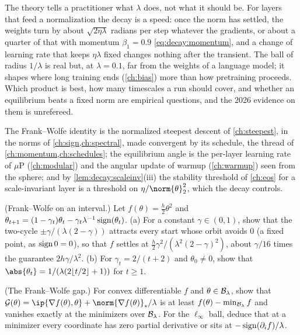 \begin{refsection}
The theory tells a practitioner what $\lambda$ does, not what it should be. For layers that feed a normalization the decay is a speed: once the norm has settled, the weights turn by about $\sqrt{2\eta\lambda}$ radians per step whatever the gradients, or about a quarter of that with momentum $\beta_1=0.9$ \eqref{eq:decay:momentum}, and a change of learning rate that keeps $\eta\lambda$ fixed changes nothing after the transient. The ball of radius $1/\lambda$ is real but, at $\lambda=0.1$, far from the weights of a language model; it shapes where long training ends (\cref{ch:bias}) more than how pretraining proceeds. Which product is best, how many timescales a run should cover, and whether an equilibrium beats a fixed norm are empirical questions, and the 2026 evidence on them is unrefereed.

The Frank--Wolfe identity is the normalized steepest descent of \cref{ch:steepest}, in the norms of \cref{ch:sign,ch:spectral}, made convergent by its schedule, the thread of \cref{ch:momentum,ch:schedules}; the equilibrium angle is the per-layer learning rate of $\mu$P (\cref{ch:modular}) and the angular update of warmup (\cref{ch:warmup}) seen from the sphere; and by \cref{lem:decay:scaleinv}(iii) the stability threshold of \cref{ch:eos} for a scale-invariant layer is a threshold on $\eta/\norm{\theta}_2^2$, which the decay controls.

\begin{exercises}
\item \consolidation (Frank--Wolfe on an interval.) Let $f(\theta)=\frac h2\theta^2$ and $\theta_{t+1}=(1-\gamma_t)\theta_t-\gamma_t\lambda^{-1}\operatorname{sign}(\theta_t)$. (a) For a constant $\gamma\in(0,1)$, show that the two-cycle $\pm\gamma/(\lambda(2-\gamma))$ attracts every start whose orbit avoids $0$ (a fixed point, as $\operatorname{sign}0=0$), so that $f$ settles at $\frac h2\gamma^2/(\lambda^2(2-\gamma)^2)$, about $\gamma/16$ times the guarantee $2h\gamma/\lambda^2$. (b) For $\gamma_t=2/(t+2)$ and $\theta_0\ne0$, show that $\abs{\theta_t}=1/(\lambda(2\lfloor t/2\rfloor+1))$ for $t\ge1$.\label{ex:decay:cycle}

\item \consolidation (The Frank--Wolfe gap.) For convex differentiable $f$ and $\theta\in\mathcal{B}_\lambda$, show that $\mathcal G(\theta)=\ip{\nabla f(\theta),\theta}+\norm{\nabla f(\theta)}_*/\lambda$ is at least $f(\theta)-\min_{\mathcal{B}_\lambda}f$ and vanishes exactly at the minimizers over $\mathcal{B}_\lambda$. For the $\ell_\infty$ ball, deduce that at a minimizer every coordinate has zero partial derivative or sits at $-\operatorname{sign}(\partial_if)/\lambda$.\label{ex:decay:gap}


\end{exercises}
\end{refsection}
